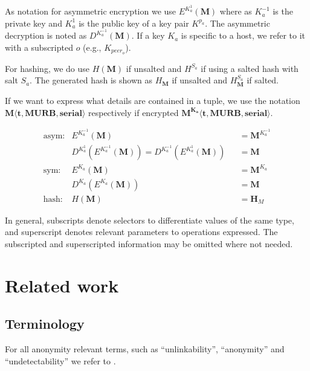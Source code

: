 \documentclass[acmsmall, screen]{acmart}
\begin{document}
As notation for asymmetric encryption we use $E^{K^{1}_a}(\mathbf{M})$ where as $K^{-1}_a$ is the private key and $K^{1}_a$ is the public key of a key pair $K^{p_a}$. The asymmetric decryption is noted as $D^{K^{-1}_a}(\mathbf{M})$. If a key $K_a$ is specific to a host, we refer to it with a subscripted $o$ (e.g., $K_{peer_o}$).

For hashing, we do use $H(\mathbf{M})$ if unsalted and $H^{S_a}$ if using a salted hash with salt $S_a$. The generated hash is shown as $H_\mathbf{M}$ if unsalted and $H^{S_a}_\mathbf{M}$ if salted.

If we want to express what details are contained in a tuple, we use the notation $\mathbf{M\langle t,MURB,serial\rangle}$ respectively if encrypted $\mathbf{M^{K_{a}}\langle t,MURB,serial\rangle}$.

\begin{align*}
\text{asym:}         & E^{K^{-1}_a}\left(\mathbf{M}\right)                            && =\mathbf{M}^{K^{-1}_a}\\
                           & D^{K^{1}_a}\left(E^{K^{-1}_a}\left(\mathbf{M}\right)\right) = D^{K^{-1}_a}\left(E^{K^{1}_a}\left(\mathbf{M}\right)\right)    && =\mathbf{M}\\
\text{sym:}          & E^{K_a}\left(\mathbf{M}\right)                                 && =\mathbf{M}^{K_a}\\
& D^{K_a}\left(E^{K_a}\left(\mathbf{M}\right)\right)          && =\mathbf{M}\\
\text{hash:}& H\left(\mathbf{M}\right)                                       && =\mathbf{H}_M
\end{align*}

In general, subscripts denote selectors to differentiate values of the same type, and superscript denotes relevant parameters to operations expressed. The subscripted and superscripted information may be omitted where not needed.

\section{Related work}
\subsection{Terminology}

For all anonymity relevant terms, such as ``unlinkability'', ``anonymity'' and ``undetectability'' we refer to \cite{anon_terminology}.
\end{document}
